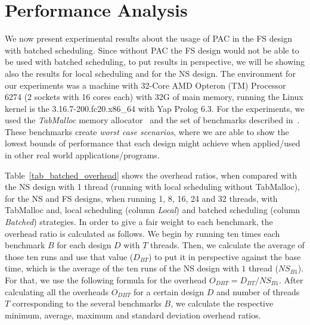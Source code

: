 \documentclass{llncs}
\begin{document}

\section{Performance Analysis}

We now present experimental results about the usage of PAC in the FS
design with batched scheduling. Since without PAC the FS design would
not be able to be used with batched scheduling, to put results in
perspective, we will be showing also the results for local scheduling
and for the NS design. The environment for our experiments was a
machine with 32-Core AMD Opteron (TM) Processor 6274 (2 sockets with
16 cores each) with 32G of main memory, running the Linux kernel is
the 3.16.7-200.fc20.x86\_64 with Yap Prolog 6.3. For the experiments,
we used the \emph{TabMalloc} memory allocator~\cite{Areias-12b} and
the set of benchmarks described in~\cite{Areias-12b}. These benchmarks
create \emph{worst case scenarios}, where we are able to show the
lowest bounds of performance that each design might achieve when
applied/used in other real world applications/programs.

Table~\ref{tab_batched_overhead} shows the overhead ratios, when
compared with the NS design with 1 thread (running with local
scheduling without TabMalloc), for the NS and FS designs, when running
1, 8, 16, 24 and 32 threads, with TabMalloc and, local scheduling
(column \emph{Local}) and batched scheduling (column \emph{Batched})
strategies. In order to give a fair weight to each benchmark, the
overhead ratio is calculated as follows. We begin by running ten times
each benchmark $B$ for each design $D$ with $T$ threads. Then, we
calculate the average of those ten runs and use that value ($D_{BT}$)
to put it in perspective against the base time, which is the average
of the ten runs of the NS design with $1$ thread ($NS_{B1}$). For
that, we use the following formula for the overhead $O_{DBT} = D_{BT}
/ NS_{B1}$. After calculating all the overheads $O_{DBT}$ for a
certain design $D$ and number of threads $T$ corresponding to the
several benchmarks $B$, we calculate the respective minimum, average,
maximum and standard deviation overhead ratios.
\end{document}
